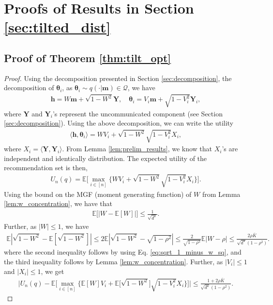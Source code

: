 \documentclass[12pt]{article}
\theoremstyle{definition}
\theoremstyle{remark}
\begin{document}
\section{Proofs of Results in Section \ref{sec:tilted_dist}}
\label{app:proofs_tilt}

\subsection{Proof of Theorem \ref{thm:tilt_opt}}

\begin{proof}
Using the decomposition presented in Section \ref{sec:decomposition}, the decomposition of $\boldsymbol{\theta}_i$, as $\boldsymbol{\theta}_i\sim q(\cdot|\mathbf{m}) \in \mathcal{Q}$, we have
\begin{align*}
\mathbf{h} = W \mathbf{m} + \sqrt{1-W^2} \mathbf{Y}, \quad \boldsymbol{\theta}_i = V_i \mathbf{m} + \sqrt{1-V_i^2} \mathbf{Y}_i,
\end{align*}
where $\mathbf{Y}$ and $\mathbf{Y}_i$'s represent the uncommunicated component (see Section \ref{sec:decomposition}). Using the above decomposition, we can write the utility
\begin{align*}
\langle \mathbf{h}, \boldsymbol{\theta}_i \rangle = W V_i + \sqrt{1-W^2}\sqrt{1-V_i^2} X_i,
\end{align*}
where $X_i = \langle \mathbf{Y}, \mathbf{Y}_i \rangle$. From Lemma \ref{lem:prelim_results}, we know that $X_i$'s are independent and identically distribution. The expected utility of the recommendation set is then,
\begin{align*}
U_n(q) = \mathbb{E} \Big[ \max_{i \in [n]} \big\{ W V_i + \sqrt{1-W^2}\sqrt{1-V_i^2} X_i \big\} \Big].
\end{align*}
Using the bound on the MGF (moment generating function) of $W$ from Lemma \ref{lem:w_concentration}, we  have that
\begin{align*}
\mathbb{E}\big[|W-\mathbb E[W]|\big] \leq \frac{1}{\sqrt{d^\star}}.
\end{align*}
Further, as $|W|\leq 1$, we have
\begin{align*}
    \mathbb E \left| \sqrt{1-W^2} - \mathbb E [\sqrt{1-W^2}]  \right| \leq 2 \mathbb E \left| \sqrt{1-W^2} - \sqrt{1-\rho^2}  \right| \leq \frac{2}{\sqrt{1-\rho^2}}\mathbb{E}|W-\rho| \leq  \frac{2\rho \bar K}{\sqrt{d^\star}(1-\rho^2)}.
\end{align*}
where the second inequality follows by using Eq. \eqref{eq:sqrt_1_minus_w_sq}, and the third inequality follows by Lemma \ref{lem:w_concentration}. Further, as $|V_i|\leq 1$ and $|X_i|\leq 1$, we get
\begin{align}
\label{eq:replace_w_expec}
\Big| U_n(q) - \mathbb{E} \Big[ \max_{i \in [n]} \big\{ \mathbb E[W] V_i + \mathbb E \big[\sqrt{1-W^2}\big] \sqrt{1-V_i^2} X_i \big\} \Big] \Big| \leq  \frac{1+2\rho \bar K}{\sqrt{d^\star}(1-\rho^2)}.
\end{align}


\end{proof}
\end{document}

